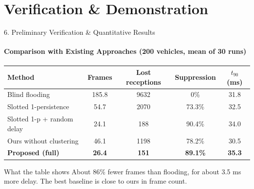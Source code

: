 \documentclass[aspectratio=169, 11pt]{beamer}
\begin{document}
\section{Verification \& Demonstration}

\begin{frame}{6. Preliminary Verification \& Quantitative Results}
    \framesubtitle{Comparison with Existing Approaches (200 vehicles, mean of 30 runs)}
    \begin{table}
        \centering
        \small
        \renewcommand{\arraystretch}{1.3}
        \begin{tabular}{p{5.2cm} c c c c}
            \toprule
            \textbf{Method} & \textbf{Frames} & \textbf{Lost receptions} & \textbf{Suppression} & \textbf{$t_{90}$ (ms)} \\
            \midrule
            Blind flooding & 185.8 & 9632 & 0\% & 31.8 \\
            Slotted 1-persistence & 54.7 & 2070 & 73.3\% & 32.5 \\
            Slotted 1-p + random delay & 24.1 & 188 & 90.4\% & 34.0 \\
            Ours without clustering & 46.1 & 1198 & 78.2\% & 30.5 \\
            \textbf{Proposed (full)} & \textbf{26.4} & \textbf{151} & \textbf{89.1\%} & \textbf{35.3} \\
            \bottomrule
        \end{tabular}
    \end{table}

    \begin{block}{What the table shows}
        \small About 86\% fewer frames than flooding, for about 3.5 ms more delay. The best baseline is close to ours in frame count.
    \end{block}
\end{frame}
\end{document}

